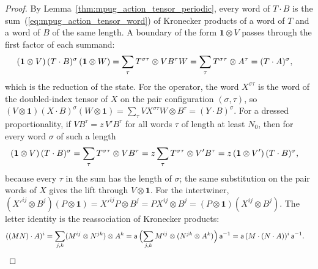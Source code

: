 \begin{proof}\leanok
    By Lemma~\ref{thm:mpug_action_tensor_periodic}, every word of
    $T\cdot B$ is the sum~(\ref{eq:mpug_action_tensor_word}) of Kronecker
    products of a word of $T$ and a word of $B$ of the same length. A
    boundary of the form $\mathbf 1\otimes V$ passes through the first
    factor of each summand:
    \begin{align}
        (\mathbf 1\otimes V)\,(T\cdot B)^{\sigma}\,(\mathbf 1\otimes W)
         & =\sum_\tau T^{\sigma\tau}\otimes VB^{\tau}W
        =\sum_\tau T^{\sigma\tau}\otimes A^{\tau}
        =(T\cdot A)^{\sigma},
        \notag
    \end{align}
    which is the reduction of the state. For the operator, the word
    $X^{\sigma\tau}$ is the word of the doubled-index tensor of $X$ on the
    pair configuration $(\sigma,\tau)$, so
    $(V\otimes\mathbf 1)(X\cdot B)^\sigma(W\otimes\mathbf 1)
        =\sum_\tau VX^{\sigma\tau}W\otimes B^\tau
        =(Y\cdot B)^\sigma$. For a dressed proportionality, if
    $VB^{\tau}=z\,V'B^{\tau}$ for all words $\tau$ of length at least $N_0$,
    then for every word $\sigma$ of such a length
    \begin{align}
        (\mathbf 1\otimes V)\,(T\cdot B)^{\sigma}
         & =\sum_\tau T^{\sigma\tau}\otimes VB^{\tau}
        =z\sum_\tau T^{\sigma\tau}\otimes V'B^{\tau}
        =z\,(\mathbf 1\otimes V')\,(T\cdot B)^{\sigma},
        \notag
    \end{align}
    because every $\tau$ in the sum has the length of $\sigma$; the same
    substitution on the pair words of $X$ gives the lift through
    $V\otimes\mathbf 1$. For the intertwiner,
    $(X'^{ij}\otimes B^j)(P\otimes\mathbf 1)=X'^{ij}P\otimes B^j
        =PX^{ij}\otimes B^j=(P\otimes\mathbf 1)(X^{ij}\otimes B^j)$.
    The letter identity is the reassociation of Kronecker products:
    \begin{align}
        ((MN)\cdot A)^i
         & =\sum_{j,k}(M^{ij}\otimes N^{jk})\otimes A^k
        =\mathsf a\,\Bigl(\sum_{j,k}M^{ij}\otimes(N^{jk}\otimes A^k)\Bigr)
        \,\mathsf a^{-1}
        =\mathsf a\,(M\cdot(N\cdot A))^i\,\mathsf a^{-1}.
        \notag
    \end{align}
\end{proof}
